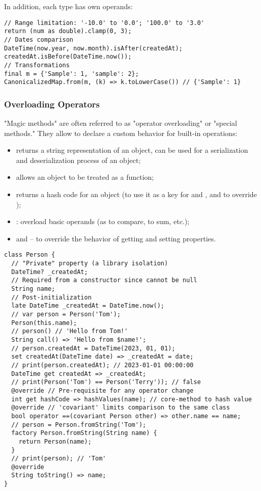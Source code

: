 \noindent In addition, each type has own operands:

\begin{lstlisting}
// Range limitation: '-10.0' to '0.0'; '100.0' to '3.0'
return (num as double).clamp(0, 3);
// Dates comparison
DateTime(now.year, now.month).isAfter(createdAt);
createdAt.isBefore(DateTime.now());
// Transformations
final m = {'Sample': 1, 'sample': 2};
CanonicalizedMap.from(m, (k) => k.toLowerCase()) // {'Sample': 1}
\end{lstlisting}


\newpage
\subsubsection{Overloading Operators}

"Magic methods" are often referred to as "operator overloading" or "special methods." They allow to declare a custom
behavior for built-in operations:

\begin{itemize}
  \item {} returns a string representation of an object, can be used for a serialization and deserialization
  process of an object;
  \item {} allows an object to be treated as a function;
  \item {} returns a hash code for an object (to use it as a key for  and , and to override \q{==});
  \item {}: overload basic operands (as \q{==} to compare, \q{+} to sum, etc.);
  \item {} and  -- to override the behavior of getting and setting properties.
\end{itemize}

\begin{lstlisting}
class Person {
  // "Private" property (a library isolation)
  DateTime? _createdAt;
  // Required from a constructor since cannot be null
  String name;
  // Post-initialization
  late DateTime _createdAt = DateTime.now();
  // var person = Person('Tom');
  Person(this.name);
  // person() // 'Hello from Tom!'
  String call() => 'Hello from $name!';
  // person.createdAt = DateTime(2023, 01, 01);
  set createdAt(DateTime date) => _createdAt = date;
  // print(person.createdAt); // 2023-01-01 00:00:00
  DateTime get createdAt => _createdAt;
  // print(Person('Tom') == Person('Terry')); // false
  @override // Pre-requisite for any operator change
  int get hashCode => hashValues(name); // core-method to hash value
  @override // 'covariant' limits comparison to the same class
  bool operator ==(covariant Person other) => other.name == name;
  // person = Person.fromString('Tom');
  factory Person.fromString(String name) {
    return Person(name);
  }
  // print(person); // 'Tom'
  @override
  String toString() => name;
}
\end{lstlisting}


